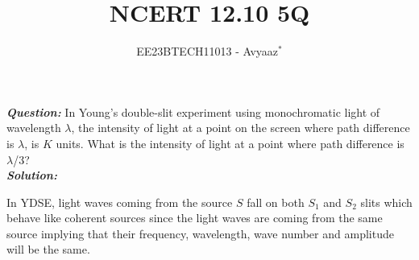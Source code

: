 \documentclass[journal,12pt,twocolumn]{IEEEtran}
\theoremstyle{remark}
\begin{document}

\vspace{3cm}

\title{NCERT 12.10 5Q}
\author{EE23BTECH11013 - Avyaaz$^{*}$%
}
\maketitle
\newpage
\bigskip

\renewcommand{\thefigure}{\theenumi}
\renewcommand{\thetable}{\arabic{table}}

\large\textbf{\textsl{Question:}}
In Young’s double-slit experiment using monochromatic light of wavelength $\lambda$, the intensity of light at a point on the screen where path difference is $\lambda$, is $K$ units. What is the intensity of light at a
point where path difference is $\lambda$/3?\\
\large\textbf{\textsl{Solution:}}
\begin{table}[htbp]
\centering

\vspace{0.2cm}
\caption{\normalsize $Parameters$}
\label{tab:parameters}
\end{table}




In YDSE, light waves coming from the source $S$ fall on both $S_1$ and $S_2$ slits which behave like coherent sources since the light waves are coming from the same source implying that their frequency, wavelength, wave number and amplitude will be the same. 

\vspace{0.3cm}
\end{document}
